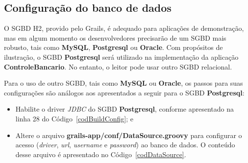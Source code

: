 \subsection{Configuração do banco de dados}

\vspace{0.5cm}

O SGBD H2, provido pelo Grails,  é adequado para aplicações de demonstração, mas
em algum  momento os  desenvolvedores precisarão de  um SGBD mais  robusto, tais
como  {\bf  MySQL},  {\bf  Postgresql}  ou  {\bf  Oracle}.   Com  propósitos  de
ilustração, o SGBD {\bf Postgresql} será utilizado na implementação da aplicação
{\bf ControleBancario}. No entanto, o leitor pode usar outro SGBD relacional.

Para o uso de outro SGBD, tais  como {\bf MySQL} ou {\bf Oracle}, os passos para
suas  configurações são  análogos aos  apresentados a  seguir para  o  SGBD {\bf
  Postgresql}: 

\vspace{0.5cm}

\begin{itemize}

\item  Habilite  o  driver  {\it   JDBC}  do  SGBD  {\bf  Postgresql},  conforme
  apresentado na linha 28 do Código~\ref{codBuildConfig}; e 

\vspace{0.5cm}

\item Altere o arquivo {\bf grails-app/conf/DataSource.groovy} para configurar o
  acesso ({\it driver}, {\it url}, {\it  username} e {\it password}) ao banco de
  dados.  O conteúdo desse arquivo é apresentado no Código~\ref{codDataSource}.  

\end{itemize}

\vspace{0.2cm}

